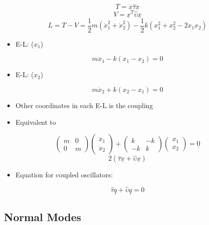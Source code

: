\documentclass[a4paper,11pt,normalem]{article}
\begin{document}
\[
    T = \underline{\dot{x}} \hat{\tau} \underline{\dot{x}}
\] \[
    V = \underline{x}^T \hat{\upsilon} \underline{x}
\] \[
    L = T - V = \frac{1}{2}m(\dot{x}_{1}^2 + \dot{x}_{2}^2) - \frac{1}{2}k(x_{1}^2 + x_{2}^2 - 2x_{1}x_{2})
\]

\begin{itemize}
\item
  E-L: (\(x_1\))
\end{itemize}

\[
    m\ddot{x}_{1} - k(x_{1} - x_2) = 0
\]

\begin{itemize}
\item
  E-L: (\(x_2\))
\end{itemize}

\[
    m\ddot{x}_2 + k(x_2 - x_1) = 0
\]

\begin{itemize}
\item
  Other coordinates in each E-L is the coupling
\item
  Equivalent to
\end{itemize}

\[
    \begin{pmatrix} m & 0 \\ 0 & m \end{pmatrix}
    \begin{pmatrix}\ddot{x}_1 \\ \ddot{x}_2 \end{pmatrix} +
    \begin{pmatrix} k & -k \\ -k & k \end{pmatrix}
    \begin{pmatrix} x_1 \\ x_2 \end{pmatrix} = \underline{0}
\] \[
    2(\hat{\tau}\underline{\ddot{x}} + \hat{\upsilon}\underline{x})
\]

\begin{itemize}
\item
  Equation for coupled oscillators:
\end{itemize}

\[
    \hat{\tau}\underline{\ddot{q}} + \hat{\upsilon}\underline{q} = 0
\]

\subsection{Normal Modes}\label{normal-modes}
\end{document}
